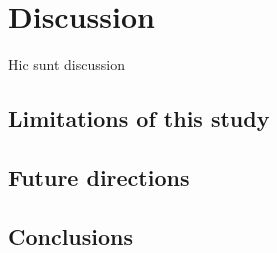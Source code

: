 
\chapter{Discussion}  
\label{chapter 5}
\ifpdf
    \graphicspath{{Chapter5/Figs/}{Chapter5/Figs/PDF/}{Chapter5/Figs/}}
\else
    \graphicspath{{Chapter5/Figs/Vector/}{Chapter5/Figs/}}
\fi

Hic sunt discussion

\section{Limitations of this study}
\label{section 5.1}



\section{Future directions}
\label{section 5.2} 



\section{Conclusions} 
\label{section 5.3} 

